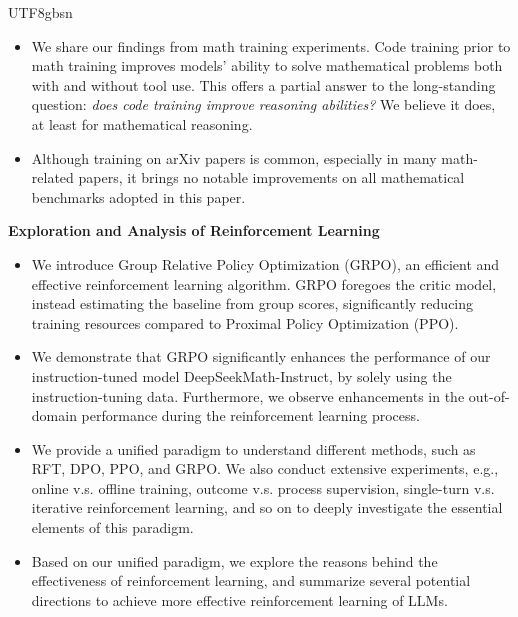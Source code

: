 \documentclass[11pt, a4paper, logo, copyright, nonumbering]{deepseek}
\begin{document}
\begin{CJK*}{UTF8}{gbsn}
\begin{itemize}[topsep=0pt]
    \item We share our findings from math training experiments.
    Code training prior to math training improves models' ability to solve mathematical problems both with and without tool use.
    This offers a partial answer to the long-standing question: \textit{does code training improve reasoning abilities?}
    We believe it does, at least for mathematical reasoning.

    \item Although training on arXiv papers is common, especially in many math-related papers, it brings no notable improvements on all mathematical benchmarks adopted in this paper.
\end{itemize}

\noindent
\textbf{Exploration and Analysis of Reinforcement Learning}
\begin{itemize}[topsep=0pt]
    \item We introduce Group Relative Policy Optimization (GRPO), an efficient and effective reinforcement learning algorithm. GRPO foregoes the critic model, instead estimating the baseline from group scores, significantly reducing training resources compared to Proximal Policy Optimization (PPO).
    \item We demonstrate that GRPO significantly enhances the performance of our instruction-tuned model DeepSeekMath-Instruct, by solely using the instruction-tuning data. 
    Furthermore, we observe enhancements in the out-of-domain performance during the reinforcement learning process.
    \item We provide a unified paradigm to understand different methods, such as RFT, DPO, PPO, and GRPO. We also conduct extensive experiments, e.g., online v.s. offline training, outcome v.s. process supervision, single-turn v.s. iterative reinforcement learning, and so on to deeply investigate the essential elements of this paradigm.
    \item Based on our unified paradigm, we explore the reasons behind the effectiveness of reinforcement learning, and summarize several potential directions to achieve more effective reinforcement learning of LLMs.
\end{itemize}


\end{CJK*}
\end{document}
